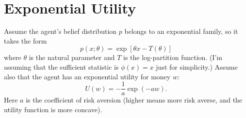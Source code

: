 
\section{Exponential Utility}

Assume the agent's belief distribution $p$ belongs to an exponential family, so it takes the form
%
\[
p(x;\theta) = \exp[\theta x - T(\theta)]
\]
%
where $\theta$ is the natural parameter and $T$ is the log-partition function. (I'm assuming that the sufficient statistic is $\phi(x) = x$ just for simplicity.) Assume also that the agent has an exponential utility for money $w$:
%
\[
U(w) = -\frac{1}{a} \exp(-aw).
\]
%
Here $a$ is the coefficient of risk aversion (higher means more risk averse, and the utility function is more concave).

